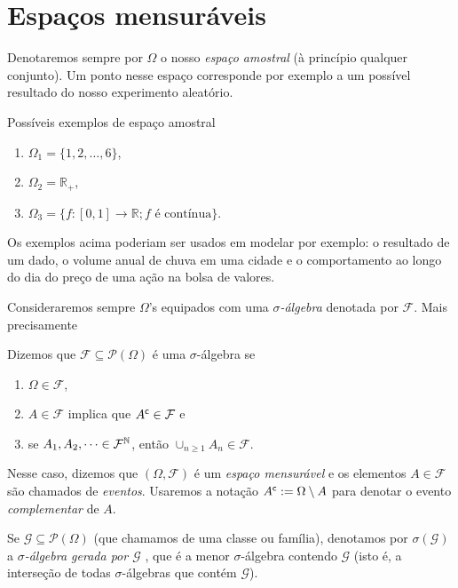 \documentclass[../main/Notas_de_aula.tex]{subfiles}
\begin{document}
\section{Espaços mensuráveis}

Denotaremos sempre por $\Omega$ o nosso \emph{espaço amostral}  (à princípio qualquer conjunto).
Um ponto nesse espaço corresponde por exemplo a um possível resultado do nosso experimento aleatório.

\begin{example} Possíveis exemplos de espaço amostral
  \label{x:espacos_amostrais}
  \begin{enumerate}[\quad a)]
  \item $\Omega_1 = \{1, 2, \dots, 6\}$,
  \item $\Omega_2 = \mathbb{R}_+$,
  \item $\Omega_3 = \{f:[0,1] \to \mathbb{R}; \text{$f$ é contínua}\}$.
  \end{enumerate}
\end{example}
Os exemplos acima poderiam ser usados em modelar por exemplo: o resultado de um dado, o volume anual de chuva em uma cidade e o comportamento ao longo do dia do preço de uma ação na bolsa de valores.

Consideraremos sempre $\Omega$'s equipados com uma \emph{$\sigma$-álgebra}  denotada por $\mathcal{F}$.
Mais precisamente
\begin{definition}
  Dizemos que $\mathcal{F} \subseteq \mathcal{P}(\Omega)$ é uma $\sigma$-álgebra se
  \begin{enumerate}[\quad a)]
  \item $\Omega \in \mathcal{F}$,
  \item $A \in \mathcal{F}$ implica que $A^{\mathsf{c}} \in \mathcal{F}$ e
  \item se $A_1, A_2, \dots \in \mathcal{F}^{{\mathbb N}}$, então $\cup_{n \ge 1} A_n \in \mathcal{F}$.
  \end{enumerate}
\end{definition}
Nesse caso, dizemos que $(\Omega, \mathcal{F})$ é um \emph{espaço mensurável}
 e os elementos $A \in \mathcal{F}$ são chamados de \emph{eventos}.
Usaremos a notação $A^{\mathsf{c}}:=\Omega\setminus A$ para denotar o evento \emph{complementar} de $A$. 

Se $\mathcal{G} \subseteq \mathcal{P}(\Omega)$ (que chamamos de uma classe ou família), denotamos por $\sigma(\mathcal{G})$ a
\emph{$\sigma$-álgebra gerada por $\mathcal{G}$} , que é a menor $\sigma$-álgebra
contendo $\mathcal{G}$ (isto é, a interseção de todas $\sigma$-álgebras que contém $\mathcal{G}$).
\end{document}

